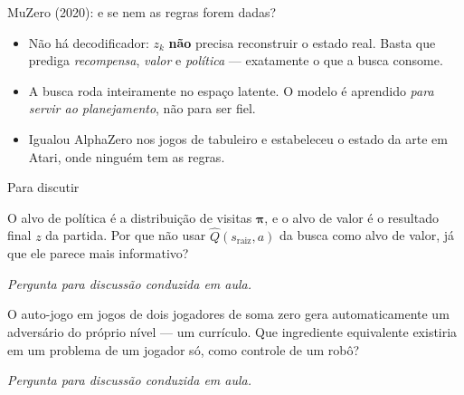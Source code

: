 \documentclass[aspectratio=169, 11pt]{beamer}
\newcommand{\paradiscussao}{\smallskip
  {\footnotesize\color{rlCinza}\itshape Pergunta para discussão conduzida em aula.}}
\newcommand{\Qh}{\widehat{Q}}                   %
\newcommand{\raiz}{s_{\mathrm{raiz}}}
\begin{document}
\begin{frame}{MuZero (2020): e se nem as regras forem dadas?}
  \centering

  \vfill
  \raggedright
  \begin{itemize}
    \item Não há decodificador: $z_k$ \textbf{não} precisa reconstruir o estado
          real. Basta que prediga \emph{recompensa}, \emph{valor} e
          \emph{política} --- exatamente o que a busca consome.
    \item A busca roda inteiramente no espaço latente. O modelo é aprendido
          \emph{para servir ao planejamento}, não para ser fiel.
    \item Igualou AlphaZero nos jogos de tabuleiro e estabeleceu o estado da arte
          em Atari, onde ninguém tem as regras.
  \end{itemize}
\end{frame}

\begin{frame}{Para discutir}
  \begin{quizbox}{}
    O alvo de política é a distribuição de visitas $\bm{\pi}$, e o alvo de valor
    é o resultado final $z$ da partida. Por que não usar $\Qh(\raiz, a)$ da busca
    como alvo de valor, já que ele parece mais informativo?
  \end{quizbox}
  \paradiscussao

  \pause
  \vfill
  \begin{quizbox}{}
    O auto-jogo em jogos de dois jogadores de soma zero gera automaticamente um
    adversário do próprio nível --- um currículo. Que ingrediente equivalente
    existiria em um problema de um jogador só, como controle de um robô?
  \end{quizbox}
  \paradiscussao
\end{frame}
\end{document}
